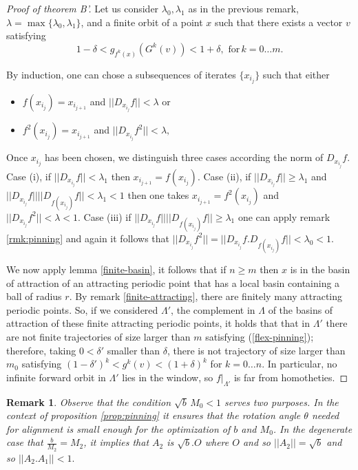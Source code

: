 \documentclass[a4paper,11pt]{article}
\newtheorem{remark}[lemma]{Remark}
\theoremstyle{definition}
\def\La{\Lambda}
\def\la{\lambda}
\def\de{\delta}
\def\La{\Lambda}
\begin{document}
\begin{proof}[Proof of theorem B'] Let us consider $\la_0, \la_1$ as in the previous remark,  $\la=\max\{\la_0, \la_1\}$, and a finite orbit of a point $x$ such that there exists a vector $v$ satisfying  
\begin{equation}\label{flex-pinning}
    1-\de< g_{f^k(x)}(G^k(v))<1+\de,\,\,\mbox{for}\, k=0\dots m.
\end{equation}
    
 By induction, one can chose a subsequences of iterates  $\{x_{i_j}\}$ such that   either 
\begin{itemize}
    \item[--] $f(x_{i_j})=x_{i_{j+1}}$ and $||D_{x_{i_j}}f||<\la$ or

    \item[--] $f^2(x_{i_j})=x_{i_{j+1}}$ and $||D_{x_{i_j}}f^2||<\la,$
\end{itemize}  

Once $x_{i_j}$ has been chosen, we distinguish three cases according the norm of $D_{x_{i_j}}f$. Case (i), if $||D_{x_{i_j}}f||<\la_1$ then $x_{i_{j+1}}=f(x_{i_j})$. Case (ii),  if $||D_{x_{i_j}}f|| \geq \la_1$ and  $||D_{x_{i_j}}f||||D_{f(x_{i_j})}f||<\la_1<1$ then one takes $x_{i_{j+1}}=f^2(x_{i_j})$ and $||D_{x_{i_j}}f^2||<\la<1$. Case (iii)  if $||D_{x_{i_j}}f||||D_{f(x_{i_j})}f||\geq \la_1$ one can apply remark  \ref{rmk:pinning} and again it follows that $||D_{x_{i_j}}f^2||=||D_{x_{i_j}}f.D_{f(x_{i_j})}f||<\la_0<1.$

We now  apply lemma \ref{finite-basin}, it follows that if $n\geq m$ then  $x$ is in the basin of attraction of an attracting  periodic point that has a local basin containing a ball of radius $r$. By remark \ref{finite-attracting}, there are finitely many  attracting periodic points. So, if we considered $\La'$, the complement in $\La$ of the basins of attraction of these finite attracting periodic points, it holds that that in $\La'$ there are not finite trajectories of size larger than $m$ satisfying (\ref{flex-pinning}); therefore, taking $0<\de'$ smaller than $\de$, there is not trajectory of size larger than $m_0$ satisfying $(1-\de')^k< g^k(v)< (1+\de)^k$ for $k=0\dots n.$ In particular, no infinite forward orbit in $\Lambda'$ lies in the window, so $f|_{\Lambda'}$ is far from homotheties.


\end{proof}
\medskip


\begin{remark} Observe that the condition $\sqrt b\, M_0 < 1$ serves two purposes. In the context of proposition \ref{prop:pinning} it ensures that the rotation angle $\theta$ needed for alignment  is small enough for the optimization of $b$ and $M_0$. In the degenerate case that $\frac{b}{M_2}=M_2$, it implies that $A_2$ is $\sqrt b. O$ where $O$ and so $||A_2||=\sqrt b$  and so $||A_2.A_1||<1.$
    
\end{remark}
\end{document}
